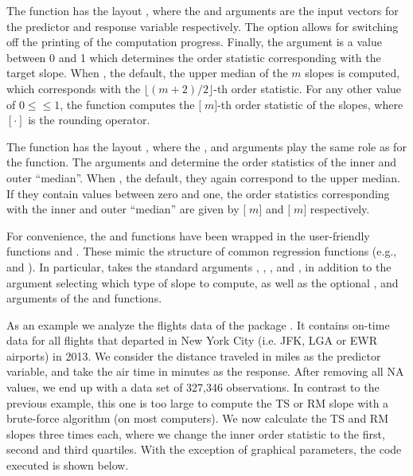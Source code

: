The  function has the layout , where the  and  arguments are the input vectors for the predictor and response variable respectively. The  option allows for switching off the printing of the computation progress.
Finally, the  argument is a value between 0 and 1 which determines the order statistic corresponding with the target slope. When , the default, the upper median  of the $m$ slopes is computed, which corresponds with the $\lfloor (m + 2) / 2\rfloor$-th order statistic. For any other value of $0\leq$$\leq 1$, the function computes the $[$$\;m]$-th order statistic of the slopes, where $[\cdot]$ is the rounding operator.\par

The  function has the layout , where the ,  and  arguments play the same role as for the  function. The arguments  and  determine the order statistics of the inner and outer ``median''. When , the default, they again correspond to the upper median. If they contain values between zero and one, the order statistics corresponding with the inner and outer ``median'' are given by $[$$\;m]$ and $[$$\;m]$ respectively.\par

For convenience, the  and  functions have been wrapped in the user-friendly functions  and . These mimic the structure of common regression functions (e.g.,  and ). In particular,  takes the standard arguments , , ,  and , in addition to the  argument selecting which type of slope to compute, as well as the optional ,  and  arguments of the  and  functions.\par 

As an example we analyze the flights data of the  package \citep{R:nycflights}. It contains on-time data for all flights that departed in New York City (i.e. JFK, LGA or EWR airports) in 2013. We consider the distance traveled in miles as the predictor variable, and take the air time in minutes as the response. After removing all NA values, we end up with a data set of 327,346 observations. In contrast to the previous example, this one is too large to compute the TS or RM slope with a brute-force algorithm (on most computers). We now calculate the TS and RM slopes three times each, where we change the inner order statistic to the first, second and third quartiles. With the exception of graphical parameters, the code executed is shown below.

